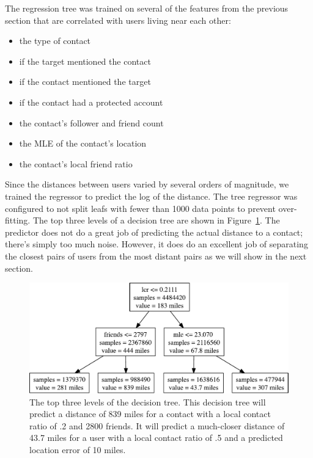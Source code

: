 The regression tree was trained on several of the features from the previous
section that are correlated with users living near each other:
\begin{itemize}
\item the type of contact
\item if the target mentioned the contact
\item if the contact mentioned the target
\item if the contact had a protected account
\item the contact's follower and friend count
\item the MLE of the contact's location
\item the contact's local friend ratio
\end{itemize}
%
Since the distances between users varied by several orders of magnitude, we
trained the regressor to predict the log of the distance.
%
The tree regressor was configured to not split leafs with fewer than 1000 data
points to prevent over-fitting.
%
The top three levels of a decision tree are shown in Figure~\ref{fig:TreeTop}.
%
The predictor does not do a great job of predicting the actual distance to a
contact; there's simply too much noise.
%
However, it does do an excellent job of separating the closest pairs of users
from the most distant pairs as we will show in the next section.

\begin{figure}[tbh]
\centering
\includegraphics[width=\linewidth]{figures/tree_top.pdf}
\caption{
    The top three levels of the decision tree. This decision tree will predict a
    distance of 839 miles for a contact with a local contact ratio of .2 and
    2800 friends. It will predict a much-closer distance of 43.7 miles for a
    user with a local contact ratio of .5 and a predicted location error of 10
    miles.
}
\label{fig:TreeTop}
\end{figure}

\label{sec:model}

